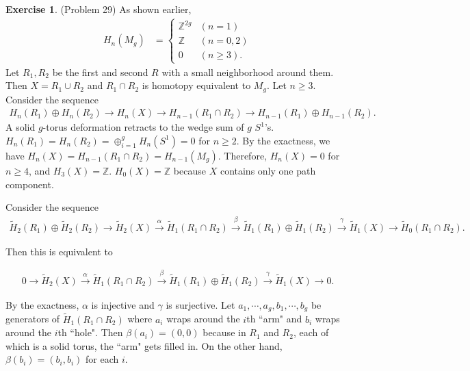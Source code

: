 \documentclass[psamsfonts]{amsart}
\theoremstyle{definition}
\newtheorem*{exer}{Exercise}
\theoremstyle{remark}
\numberwithin{equation}{section}
\begin{document}
\begin{exer}{(Problem 29)}
  As shown earlier,
  \begin{align*}
    H_n(M_g) &= \begin{cases}
      \mathbb{Z}^{2g} & (n = 1) \\
      \mathbb{Z} & (n = 0, 2) \\
      0 & (n \geq 3).
    \end{cases}
  \end{align*}
  Let $R_1, R_2$ be the first and second $R$ with a small neighborhood around them.
  Then $X = R_1 \cup R_2$ and $R_1 \cap R_2$ is homotopy equivalent to $M_g$.
  Let $n \geq 3$.
  Consider the sequence 
  \begin{align*}
    H_n(R_1) \oplus H_n(R_2) \rightarrow H_n(X) \rightarrow H_{n - 1}(R_1 \cap R_2) \rightarrow H_{n - 1}(R_1) \oplus H_{n - 1}(R_2).
  \end{align*}
  A solid $g$-torus deformation retracts to the wedge sum of $g$ $S^1$'s.
  $H_n(R_1) = H_n(R_2) = \oplus_{i=1}^g H_n(S^1) = 0$ for $n \geq 2$.
  By the exactness, we have $H_n(X) = H_{n - 1}(R_1 \cap R_2) = H_{n - 1}(M_g)$.
  Therefore, $H_n(X) = 0$ for $n \geq 4$, and $H_3(X) = \mathbb{Z}$.
  $H_0(X) = \mathbb{Z}$ because $X$ contains only one path component.

  Consider the sequence 
  \begin{align*}
    \tilde{H}_2(R_1) \oplus \tilde{H}_2(R_2) \rightarrow \tilde{H}_2(X) \xrightarrow{\alpha} \tilde{H}_{1}(R_1 \cap R_2) \xrightarrow{\beta} \tilde{H}_{1}(R_1) \oplus \tilde{H}_{1}(R_2) \xrightarrow{\gamma} \tilde{H}_1(X) \rightarrow \tilde{H}_0(R_1 \cap R_2).
  \end{align*}

  Then this is equivalent to

  \begin{align*}
    0 \rightarrow \tilde{H}_2(X) \xrightarrow{\alpha} \tilde{H}_{1}(R_1 \cap R_2) \xrightarrow{\beta} \tilde{H}_{1}(R_1) \oplus \tilde{H}_{1}(R_2) \xrightarrow{\gamma} \tilde{H}_1(X) \rightarrow 0.
  \end{align*}

  By the exactness, $\alpha$ is injective and $\gamma$ is surjective.
  Let $a_1, \cdots, a_g, b_1, \cdots, b_g$ be generators of $\tilde{H}_1(R_1 \cap R_2)$ where $a_i$ wraps around the $i$th ``arm" and $b_i$ wraps around the $i$th ``hole".
  Then $\beta(a_i) = (0, 0)$ because in $R_1$ and $R_2$, each of which is a solid torus, the ``arm" gets filled in.
  On the other hand, $\beta(b_i) = (b_i, b_i)$ for each $i$.


\end{exer}
\end{document}
